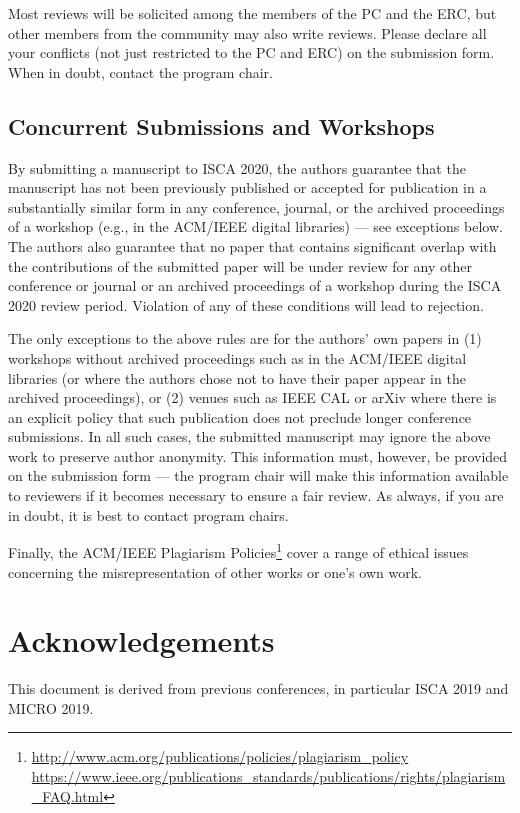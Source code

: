 \documentclass[conference]{IEEEtran}
\begin{document}
Most reviews will be solicited among the members of the PC and the ERC, but other
members from the community may also write reviews. Please declare all
your conflicts (not just restricted to the PC and ERC) on the
submission form. When in doubt, contact the program chair. 


\subsection{Concurrent Submissions and Workshops}
By submitting a manuscript to ISCA 2020, the authors guarantee that
the manuscript has not been previously published or accepted for
publication in a substantially similar form in any conference,
journal, or the archived proceedings of a workshop (e.g., in the
ACM/IEEE digital libraries) --- see exceptions below. The authors also
guarantee that no paper that contains significant overlap with the
contributions of the submitted paper will be under review for any
other conference or journal or an archived proceedings of a workshop
during the ISCA 2020 review period. Violation of any of these
conditions will lead to rejection. 

The only exceptions to the above rules are for the authors' own papers
in (1) workshops without archived proceedings such as in the ACM/IEEE
digital libraries (or where the authors chose not to have their paper
appear in the archived proceedings), or (2) venues such as IEEE CAL or
arXiv where there is an explicit policy that such publication does not
preclude longer conference submissions.  In all such cases, the
submitted manuscript may ignore the above work to preserve author
anonymity. This information must, however, be provided on the
submission form --- the program chair will make this information available
to reviewers if it becomes necessary to ensure a fair review.  As
always, if you are in doubt, it is best to contact program chairs. 


Finally, the ACM/IEEE Plagiarism Policies\footnote{\url{http://www.acm.org/publications/policies/plagiarism_policy}\\
\url{https://www.ieee.org/publications_standards/publications/rights/plagiarism_FAQ.html}}
cover a range of ethical issues concerning the misrepresentation of
other works or one's own work. 


\section*{Acknowledgements}
This document is derived from previous conferences, in particular ISCA
2019 and MICRO 2019.





\end{document}
